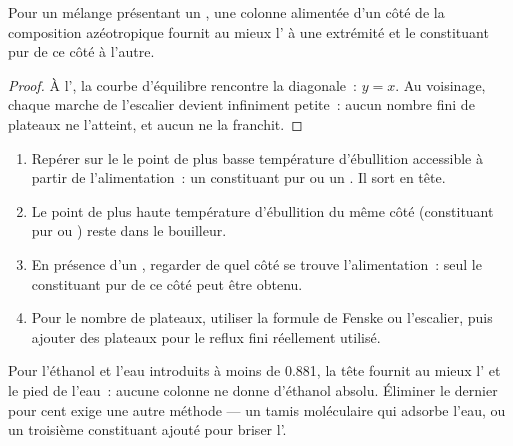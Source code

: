 \begin{proposition}\label{prop:b2:liquid-vapour-diagrams:azeotrope-limit}
Pour un mélange présentant un , une colonne alimentée d'un côté de la
composition azéotropique fournit au mieux l' à une extrémité et le constituant pur
de ce côté à l'autre.
\end{proposition}

\begin{proof}
À l', la courbe d'équilibre rencontre la diagonale~: $y = x$. Au voisinage,
chaque marche de l'escalier devient infiniment petite~: aucun nombre fini de
plateaux ne l'atteint, et aucun ne la franchit.
\end{proof}

\begin{method}\label{met:b2:liquid-vapour-diagrams:predict-distillation}
\begin{enumerate}
  \item Repérer sur le  le point de plus basse température d'ébullition accessible à partir de
        l'alimentation~: un constituant pur ou un . Il sort
        en tête.
  \item Le point de plus haute température d'ébullition du même côté (constituant pur ou
        ) reste dans le bouilleur.
  \item En présence d'un , regarder de quel côté se trouve l'alimentation~: seul le
        constituant pur de ce côté peut être obtenu.
  \item Pour le nombre de plateaux, utiliser la formule de Fenske ou l'escalier,
        puis ajouter des plateaux pour le reflux fini réellement utilisé.
\end{enumerate}
\end{method}

Pour l'éthanol et l'eau introduits à moins de 0.881, la tête fournit au mieux
l' et le pied de l'eau~: aucune colonne ne donne d'éthanol absolu. Éliminer
le dernier pour cent exige une autre méthode --- un tamis moléculaire qui adsorbe l'eau, ou
un troisième constituant ajouté pour briser l'.

